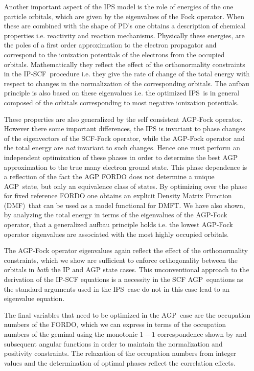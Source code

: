 \documentclass[aps,preprint]{revtex4}%
\begin{document}
Another important aspect of the IPS model is the role of energies of the one
particle orbitals, which are given by the eigenvalues of the Fock operator.
When these are combined with the shape of PD's one obtains a description of
chemical properties i.e. reactivity and reaction mechanisms. Physically these
energies, are the poles of a first order approximation to the electron
propagator and correspond to the ionization potentials of the electrons from
the occupied orbitals. Mathematically they reflect the effect of the
orthonormality constraints in the IP-SCF\ procedure i.e. they give the rate of
change of the total energy with respect to changes in the normalization of the
corresponding orbitals. The aufbau principle is also based on these
eigenvalues i.e. the optimized IPS\ is in general composed of the orbitals
corresponding to most negative ionization potentials.

These properties are also generalized by the self consistent AGP-Fock
operator. However there some important differences, the IPS is invariant to
phase changes of the eigenvectors of the SCF-Fock operator, while the AGP-Fock
operator and the total energy are \emph{not }invariant to such changes. Hence
one must perform an independent optimization of these phases in order to
determine the best AGP approximation to the true many electron ground state.
This phase dependence is a reflection of the fact the AGP FORDO does not
determine a unique AGP\ state, but only an equivalence class of states. By
optimizing over the phase for fixed reference FORDO one obtains an explicit
Density Matrix Function (DMF)\ that can be used as a model functional for
DMFT. We have also shown, by analyzing the total energy in terms of the
eigenvalues of the AGP-Fock operator, that a generalized aufbau principle
holds i.e. the lowest AGP-Fock operator eigenvalues are associated with the
most highly occupied orbitals.

The AGP-Fock operator eigenvalues again reflect the effect of the
orthonormality constraints, which we show are sufficient to enforce
orthogonality between the orbitals in \emph{both }the IP and AGP state cases.
This unconventional approach to the derivation of the IP-SCF equations is a
necessity in the SCF AGP\ equations as the standard arguments used in the
IPS\ case do not in this case lead to an eigenvalue equation.

The final variables that need to be optimized in the AGP\ case are the
occupation numbers of the FORDO, which we can express in terms of the
occupation numbers of the geminal using the monotonic $1-1$ correspondence
shown by \cite{Coleman} and subsequent angular functions in order to maintain
the normalization and positivity constraints. The relaxation of the occupation
numbers from integer values and the determination of optimal phases reflect
the correlation effects.
\end{document}
